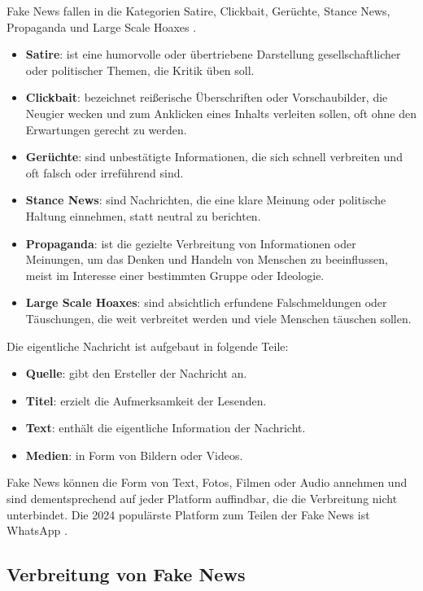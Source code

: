 Fake News fallen in die Kategorien Satire, Clickbait, Gerüchte, Stance News, Propaganda und Large Scale Hoaxes \cite{Sharma:2024}.

\begin{itemize}
    \item \textbf{Satire}: ist eine humorvolle oder übertriebene Darstellung gesellschaftlicher oder politischer Themen, die Kritik üben soll.
    \item \textbf{Clickbait}: bezeichnet reißerische Überschriften oder Vorschaubilder, die Neugier wecken und zum Anklicken eines Inhalts verleiten sollen, oft ohne den Erwartungen gerecht zu werden.
    \item \textbf{Gerüchte}: sind unbestätigte Informationen, die sich schnell verbreiten und oft falsch oder irreführend sind.
    \item \textbf{Stance News}: sind Nachrichten, die eine klare Meinung oder politische Haltung einnehmen, statt neutral zu berichten.
    \item \textbf{Propaganda}: ist die gezielte Verbreitung von Informationen oder Meinungen, um das Denken und Handeln von Menschen zu beeinflussen, meist im Interesse einer bestimmten Gruppe oder Ideologie.
    \item \textbf{Large Scale Hoaxes}: sind absichtlich erfundene Falschmeldungen oder Täuschungen, die weit verbreitet werden und viele Menschen täuschen sollen.
\end{itemize}

Die eigentliche Nachricht ist aufgebaut in folgende Teile:

\begin{itemize}
    \item \textbf{Quelle}: gibt den Ersteller der Nachricht an.
    \item \textbf{Titel}: erzielt die Aufmerksamkeit der Lesenden.
    \item \textbf{Text}: enthält die eigentliche Information der Nachricht.
    \item \textbf{Medien}: in Form von Bildern oder Videos.
\end{itemize}

Fake News können die Form von Text, Fotos, Filmen oder Audio annehmen und sind dementsprechend auf jeder Platform auffindbar, 
die die Verbreitung nicht unterbindet. Die 2024 populärste Platform zum Teilen der Fake News ist WhatsApp \cite{Ashish2024}.

\subsection{Verbreitung von Fake News}

